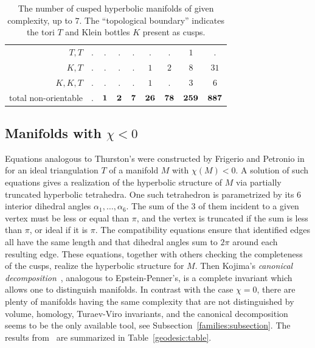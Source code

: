 \documentclass[10pt]{article}      %
\begin{document}
\begin{table}
\begin{center}
\begin{tabular}{rcccccccc}
      $T,T$ & . & .   & .   & .   & .    & .    & $1$   & .     \\
      
      $K,T$ & . & .   & .   & .   & $1$  & $2$  & $8$   & $31$  \\
      
      $K,K,T$ & . & .   & .   & .   & $1$  & .    & $3$   & $6$   \\

      total non-orientable 
      & . & $\bf 1$ & $\bf 2$ & $\bf 7$ & $\bf{26}$ & $\bf{78}$ & $\bf{259}$ & $\bf{887}$
      
      
    \end{tabular}
  \end{center}
  \caption{The number of cusped hyperbolic manifolds of
    given complexity, up to $7$. The ``topological boundary'' indicates the tori $T$ and Klein bottles
    $K$ present as cusps.}
  \label{cusped:table}
\end{table}

\subsection{Manifolds with $\chi<0$} \label{Kojima:subsection}
Equations analogous to Thurston's were constructed by Frigerio and Petronio in~\cite{FriPe}
for an ideal triangulation $T$ of a manifold $M$ with $\chi(M)<0$.
A solution of such equations gives a realization of the hyperbolic structure of $M$
via partially truncated hyperbolic tetrahedra. One such tetrahedron is
parametrized by its $6$ interior dihedral angles $\alpha_1,\ldots,\alpha_6$.
The sum of the $3$ of them incident to a given vertex must be less or equal than $\pi$,
and the vertex is truncated if the sum is less than $\pi$, or ideal if it is $\pi$.
The compatibility equations ensure that identified edges all have the same length and
that dihedral angles sum to $2\pi$ around each resulting edge. These equations, together with others 
checking the completeness
of the cusps, realize the hyperbolic structure for $M$. Then Kojima's \emph{canonical
decomposition}~\cite{Koj}, analogous to Epstein-Penner's,
is a complete invariant which allows one 
to distinguish manifolds. In contrast with the case $\chi=0$, there are plenty of manifolds
having the same complexity that are not distinguished by volume, homology, Turaev-Viro invariants,
and the canonical decomposition seems to be the only available tool, see 
Subsection~\ref{families:subsection}.
The results from~\cite{FriMaPe2} are summarized in Table~\ref{geodesic:table}.
\end{document}
